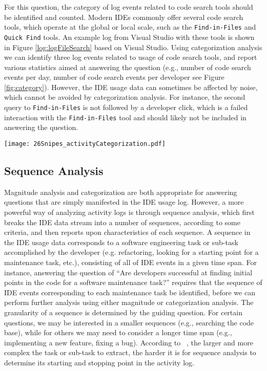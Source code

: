 For this question, the category of log events related to code search tools should be identified and counted. Modern IDEs commonly offer several code search tools, which operate at the global or local scale, such as the {\tt Find-in-Files} and {\tt Quick Find} tools.  An example log from Visual Studio with these tools is shown in Figure \ref{log:logFileSearch} based on Visual Studio. Using categorization analysis we can identify three
log events related to usage of code search tools, and report various statistics aimed at answering the question (e.g., number of code search events per day, number of code search events per developer see Figure \ref{fig:category}). However, the IDE usage data can sometimes be affected by noise, which cannot be avoided by categorization analysis. For instance, the second query to {\tt Find-in-Files} is not followed by a developer click, which is a failed interaction with the {\tt Find-in-Files} tool and should likely not be included in answering the question.


\begin{figure*}[t]
\centering

\texttt{[image: 26Snipes\_activityCategorization.pdf]}
\caption{Categorized Log Events with Search Category}
\label{fig:category}
\end{figure*}


\subsection{Sequence Analysis}

Magnitude analysis and categorization are both appropriate for answering questions that are simply manifested in the IDE usage log. However, a more powerful way of analyzing activity logs is through sequence analysis, which first breaks the IDE data stream into a number of sequences, according to some criteria, and then reports upon characteristics of each sequence. A sequence in the IDE usage data corresponds to a software engineering task or sub-task accomplished by the developer (e.g. refactoring, looking for a starting point for a maintenance task, etc.), consisting of all of IDE events in a given time span. For instance, answering the question of ``Are developers successful at finding initial points in the code for a software maintenance task?'' requires that the sequence of IDE events corresponding to each maintenance task be identified, before we can perform further analysis using either magnitude or categorization analysis. The granularity of a sequence is determined by the guiding question. For certain questions, we may be interested in a smaller sequences (e.g., searching the code base), while for others we may need to consider a longer time span (e.g., implementing a new feature, fixing a bug). 
According to ~\citet{Zou-ComanIndustry}, the larger and more complex the task or sub-task to extract, the harder it is for sequence analysis to determine its starting and stopping point in the activity log.

